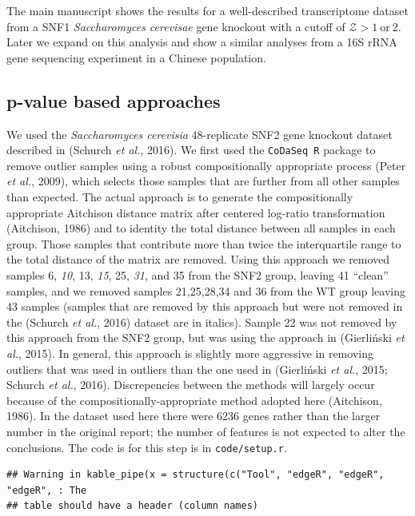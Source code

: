 \documentclass[onecolumn]{article}
\begin{document}
The main manuscript shows the results for a well-described transcriptome
dataset from a SNF1 \emph{Saccharomyces cerevisae} gene knockout with a
cutoff of \(\mathcal{Z} > 1 \mathrm{\ or\ } 2\). Later we expand on this
analysis and show a similar analyses from a 16S rRNA gene sequencing
experiment in a Chinese population.

\hypertarget{p-value-based-approaches}{%
\subsection{p-value based approaches}\label{p-value-based-approaches}}

We used the \emph{Saccharomyces cerevisia} 48-replicate SNF2 gene
knockout dataset described in (Schurch \emph{et al.}, 2016). We first
used the \texttt{CoDaSeq\ R} package to remove outlier samples using a
robust compositionally appropriate process (Peter \emph{et al.}, 2009),
which selects those samples that are further from all other samples than
expected. The actual approach is to generate the compositionally
appropriate Aitchison distance matrix after centered log-ratio
transformation (Aitchison, 1986) and to identity the total distance
between all samples in each group. Those samples that contribute more
than twice the interquartile range to the total distance of the matrix
are removed. Using this approach we removed samples 6, \emph{10}, 13,
\emph{15}, 25, \emph{31}, and 35 from the SNF2 group, leaving 41
``clean'' samples, and we removed samples 21,25,28,34 and 36 from the WT
group leaving 43 samples (samples that are removed by this approach but
were not removed in the (Schurch \emph{et al.}, 2016) dataset are in
italics). Sample 22 was not removed by this approach from the SNF2
group, but was using the approach in (Gierliński \emph{et al.}, 2015).
In general, this approach is slightly more aggressive in removing
outliers that was used in outliers than the one used in (Gierliński
\emph{et al.}, 2015; Schurch \emph{et al.}, 2016). Discrepencies between
the methods will largely occur because of the
compositionally-appropriate method adopted here (Aitchison, 1986). In
the dataset used here there were 6236 genes rather than the larger
number in the original report; the number of features is not expected to
alter the conclusions. The code is for this step is in
\texttt{code/setup.r}.

\begin{verbatim}
## Warning in kable_pipe(x = structure(c("Tool", "edgeR", "edgeR", "edgeR", : The
## table should have a header (column names)
\end{verbatim}
\end{document}
